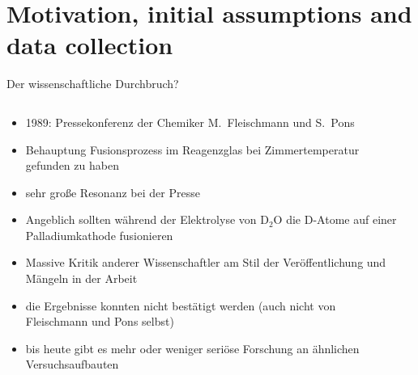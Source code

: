 \section{Motivation, initial assumptions and data collection}

\begin{frame}{Der wissenschaftliche Durchbruch?}
    \pause
    \begin{columns}
        \begin{column}{0.6\textwidth}
            \begin{itemize}
                \item<+-> 1989: Pressekonferenz der Chemiker M.~Fleischmann und S.~Pons
                \item<+-> Behauptung Fusionsprozess im Reagenzglas bei Zimmertemperatur gefunden zu haben
                \item<+-> sehr große Resonanz bei der Presse
                \item<+-> Angeblich sollten während der Elektrolyse von $\mathrm{D_2O}$ die $\mathrm{D}$-Atome auf einer Palladiumkathode fusionieren
                \item<+-> Massive Kritik anderer Wissenschaftler am Stil der Veröffentlichung und Mängeln in der Arbeit
                \item<+-> die Ergebnisse konnten nicht bestätigt werden (auch nicht von Fleischmann und Pons selbst)
                \item<+-> bis heute gibt es mehr oder weniger seriöse Forschung an ähnlichen Versuchsaufbauten
            \end{itemize}
        \end{column}
        \begin{column}{0.4\textwidth}
            \begin{center}
                

\end{center}
\end{column}
\end{columns}
\end{frame}
